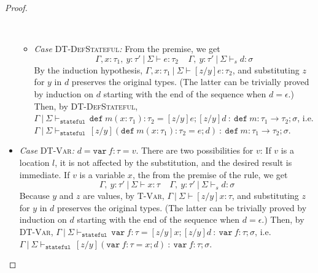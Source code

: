 \documentclass{llncs}
\newcommand{\keywadj}[1]{\mathtt{#1}}
\newcommand{\keyw}[1]{\keywadj{#1}~}
\begin{document}
\begin{proof}
\begin{pcases}
\begin{itemize}
\begin{itemize}
\\
\item[] \textit{Case} \textsc{DT-DefStateful}\textit{:} From the premise, we get
\[
\Gamma, x : \tau_1,~y : \tau'~|~\Sigma \vdash e : \tau_2~~~~~\Gamma,~y : \tau'~|~\Sigma \vdash_s d : \sigma
\]
By the induction hypothesis, $\Gamma, x : \tau_1~|~\Sigma \vdash [z/y]e : \tau_2$, and substituting $z$ for $y$ in $d$ preserves the original types. (The latter can be trivially proved by induction on $d$ starting with the end of the sequence when $d = \epsilon$.) Then, by \textsc{DT-DefStateful}, $\Gamma~|~\Sigma \vdash_{\keyw{stateful}} \keyw{def} m(x : \tau_1) : \tau_2 = [z/y]e; [z/y]d~:~\keyw{def} m : \tau_1 \rightarrow \tau_2; \sigma$, i.e. $\Gamma~|~\Sigma \vdash_{\keyw{stateful}} [z/y](\keyw{def} m(x : \tau_1) : \tau_2 = e; d)~:~\keyw{def} m : \tau_1 \rightarrow \tau_2; \sigma$.
\\
\end{itemize}

\item[] \textit{Case} \textsc{DT-Var}\textit{:} $d = \keyw{var} f : \tau = v$. There are two possibilities for $v$: If $v$ is a location $l$, it is not affected by the substitution, and the desired result is immediate. If $v$ is a variable $x$, the from the premise of the rule, we get
\[
\Gamma,~y : \tau'~|~\Sigma \vdash x : \tau~~~~~\Gamma,~y : \tau'~|~\Sigma \vdash_s d : \sigma
\]
Because $y$ and $z$ are values, by \textsc{T-Var}, $\Gamma~|~\Sigma \vdash [z/y]x : \tau$, and substituting $z$ for $y$ in $d$ preserves the original types. (The latter can be trivially proved by induction on $d$ starting with the end of the sequence when $d = \epsilon$.) Then, by \textsc{DT-Var}, $\Gamma~|~\Sigma \vdash_{\keyw{stateful}} \keyw{var} f : \tau = [z/y]x; [z/y]d~:~\keyw{var} f : \tau; \sigma$, i.e. $\Gamma~|~\Sigma \vdash_{\keyw{stateful}} [z/y](\keyw{var} f : \tau = x; d)~:~\keyw{var} f : \tau; \sigma$.
\\
\end{itemize}


\end{pcases}
\end{proof}
\end{document}
